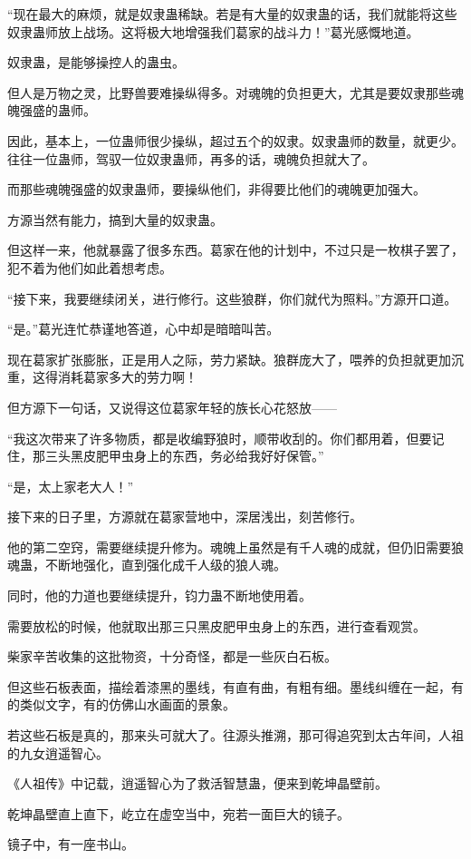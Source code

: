 \begin{this_body}
“现在最大的麻烦，就是奴隶蛊稀缺。若是有大量的奴隶蛊的话，我们就能将这些奴隶蛊师放上战场。这将极大地增强我们葛家的战斗力！”葛光感慨地道。

奴隶蛊，是能够操控人的蛊虫。

但人是万物之灵，比野兽要难操纵得多。对魂魄的负担更大，尤其是要奴隶那些魂魄强盛的蛊师。

因此，基本上，一位蛊师很少操纵，超过五个的奴隶。奴隶蛊师的数量，就更少。往往一位蛊师，驾驭一位奴隶蛊师，再多的话，魂魄负担就大了。

而那些魂魄强盛的奴隶蛊师，要操纵他们，非得要比他们的魂魄更加强大。

方源当然有能力，搞到大量的奴隶蛊。

但这样一来，他就暴露了很多东西。葛家在他的计划中，不过只是一枚棋子罢了，犯不着为他们如此着想考虑。

“接下来，我要继续闭关，进行修行。这些狼群，你们就代为照料。”方源开口道。

“是。”葛光连忙恭谨地答道，心中却是暗暗叫苦。

现在葛家扩张膨胀，正是用人之际，劳力紧缺。狼群庞大了，喂养的负担就更加沉重，这得消耗葛家多大的劳力啊！

但方源下一句话，又说得这位葛家年轻的族长心花怒放——

“我这次带来了许多物质，都是收编野狼时，顺带收刮的。你们都用着，但要记住，那三头黑皮肥甲虫身上的东西，务必给我好好保管。”

“是，太上家老大人！”

接下来的日子里，方源就在葛家营地中，深居浅出，刻苦修行。

他的第二空窍，需要继续提升修为。魂魄上虽然是有千人魂的成就，但仍旧需要狼魂蛊，不断地强化，直到强化成千人级的狼人魂。

同时，他的力道也要继续提升，钧力蛊不断地使用着。

需要放松的时候，他就取出那三只黑皮肥甲虫身上的东西，进行查看观赏。

柴家辛苦收集的这批物资，十分奇怪，都是一些灰白石板。

但这些石板表面，描绘着漆黑的墨线，有直有曲，有粗有细。墨线纠缠在一起，有的类似文字，有的仿佛山水画面的景象。

若这些石板是真的，那来头可就大了。往源头推溯，那可得追究到太古年间，人祖的九女逍遥智心。

《人祖传》中记载，逍遥智心为了救活智慧蛊，便来到乾坤晶壁前。

乾坤晶壁直上直下，屹立在虚空当中，宛若一面巨大的镜子。

镜子中，有一座书山。


\end{this_body}
